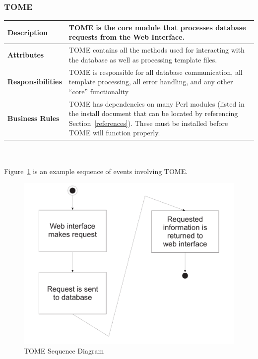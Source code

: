 \documentclass[12pt,titlepage]{article}
\begin{document}
\subsubsection{TOME}
\begin{tabular}{|p{}|p{}|}
	\hline
	\textbf{Description} & TOME is the core module that processes database requests from the Web Interface.\\
	\hline
	\textbf{Attributes} & TOME contains all the methods used for interacting with the database as well as processing template files.\\
	\hline
	\textbf{Responsibilities} & TOME is responsible for all database communication, all template processing, all error handling, and any other ``core'' functionality\\
	\hline
	\textbf{Business Rules} & TOME has dependencies on many Perl modules (listed in the install document that can be located by referencing Section~\ref{references}).  These must be installed before TOME will function properly.\\
	\hline
\end{tabular}
\\
\\
Figure~\ref{TOMESequenceDiagram} is an example sequence of events involving TOME.
\begin{figure}[h]
	\centering
	\includegraphics[width=.5\textwidth]{TOMESequenceDiagram}
	\caption{TOME Sequence Diagram}
	\label{TOMESequenceDiagram}
\end{figure}
\end{document}
